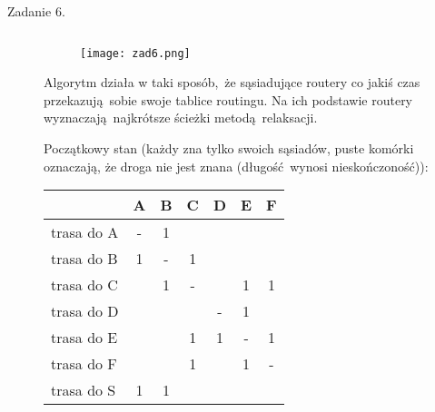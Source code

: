 \documentclass[a4paper, oneside]{article}
\begin{document}
\begin{description}
\begin{description}
    \end{description}

    \item[Zadanie 6.]$ $
    \begin{figure}[H]
        \centering
        \texttt{[image: zad6.png]}
    \end{figure}

    Algorytm działa w taki sposób, że sąsiadujące routery co jakiś
    czas przekazują sobie swoje tablice routingu. Na ich podstawie 
    routery wyznaczają najkrótsze ścieżki metodą relaksacji.

    Początkowy stan (każdy zna tylko swoich sąsiadów, puste komórki oznaczają,
    że droga nie jest znana (długość wynosi nieskończoność)):
    \begin{table}[H]
    \centering
    \begin{tabular}{|l|c|c|c|c|c|c|}
    \hline
    & \textbf{A} & \textbf{B} 
    & \textbf{C} & \textbf{D} 
    & \textbf{E} & \textbf{F} \\ \hline\hline
    trasa do A & - & 1 &   &   &   &   \\ \hline
    trasa do B & 1 & - & 1 &   &   &   \\ \hline
    trasa do C &   & 1 & - &   & 1 & 1 \\ \hline
    trasa do D &   &   &   & - & 1 &   \\ \hline
    trasa do E &   &   & 1 & 1 & - & 1 \\ \hline
    trasa do F &   &   & 1 &   & 1 & - \\ \hline
    trasa do S & 1 & 1 &   &   &   &   \\ \hline
    \end{tabular}
    \end{table}


\end{description}
\end{document}
